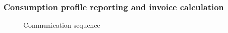 \documentclass[english]{llncs}
\begin{document}
\subsubsection{Consumption profile reporting and invoice calculation}
\label{calculation}


\begin{figure}
\centering

 \begin{sequencediagram}

    




  \end{sequencediagram}
\caption{Communication sequence}
\label{fig:sequence}
\end{figure}
\end{document}

